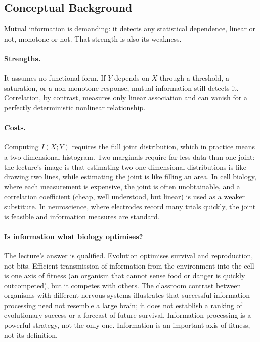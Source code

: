 \subsection*{Conceptual Background}
Mutual information is demanding: it detects any statistical dependence, linear or not, monotone or not. That strength is also its weakness.

\paragraph{Strengths.} It assumes no functional form. If $Y$ depends on $X$ through a threshold, a saturation, or a non-monotone response, mutual information still detects it. Correlation, by contrast, measures only linear association and can vanish for a perfectly deterministic nonlinear relationship.

\paragraph{Costs.} Computing $I(X;Y)$ requires the full joint distribution, which in practice means a two-dimensional histogram. Two marginals require far less data than one joint: the lecture's image is that estimating two one-dimensional distributions is like drawing two lines, while estimating the joint is like filling an area. In cell biology, where each measurement is expensive, the joint is often unobtainable, and a correlation coefficient (cheap, well understood, but linear) is used as a weaker substitute. In neuroscience, where electrodes record many trials quickly, the joint is feasible and information measures are standard.

\paragraph{Is information what biology optimises?} The lecture's answer is qualified. Evolution optimises survival and reproduction, not bits. Efficient transmission of information from the environment into the cell is one axis of fitness (an organism that cannot sense food or danger is quickly outcompeted), but it competes with others. The classroom contrast between organisms with different nervous systems illustrates that successful information processing need not resemble a large brain; it does not establish a ranking of evolutionary success or a forecast of future survival. Information processing is a powerful strategy, not the only one. Information is an important axis of fitness, not its definition.


